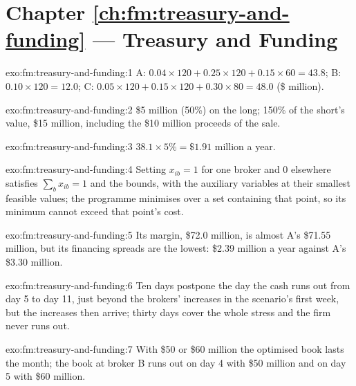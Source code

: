 \section*{Chapter \ref{ch:fm:treasury-and-funding} --- Treasury and Funding}

\begin{solution}{exo:fm:treasury-and-funding:1}
A: $0.04\times120+0.25\times120+0.15\times60=43.8$; B: $0.10\times120=12.0$; C: $0.05\times120+0.15\times120+0.30\times80=48.0$ (\$ million).
\end{solution}

\begin{solution}{exo:fm:treasury-and-funding:2}
\$5 million (50\%) on the long; 150\% of the short's value, \$15 million, including the \$10 million proceeds of the sale.
\end{solution}

\begin{solution}{exo:fm:treasury-and-funding:3}
$38.1\times5\%=\$1.91$ million a year.
\end{solution}

\begin{solution}{exo:fm:treasury-and-funding:4}
Setting $x_{ib}=1$ for one broker and 0 elsewhere satisfies $\sum_bx_{ib}=1$ and the bounds, with the auxiliary variables at their smallest
feasible values; the programme minimises over a set containing that point, so its minimum cannot exceed that point's cost.
\end{solution}

\begin{solution}{exo:fm:treasury-and-funding:5}
Its margin, \$72.0 million, is almost A's \$71.55 million, but its financing spreads are the lowest: \$2.39 million a year against A's \$3.30
million.
\end{solution}

\begin{solution}{exo:fm:treasury-and-funding:6}
Ten days postpone the day the cash runs out from day 5 to day 11, just beyond the brokers' increases in the scenario's first week, but the increases
then arrive; thirty days cover the whole stress and the firm never runs out.
\end{solution}

\begin{solution}{exo:fm:treasury-and-funding:7}
With \$50 or \$60 million the optimised book lasts the month; the book at broker B runs out on day 4 with \$50 million and on day 5 with \$60
million.
\end{solution}


